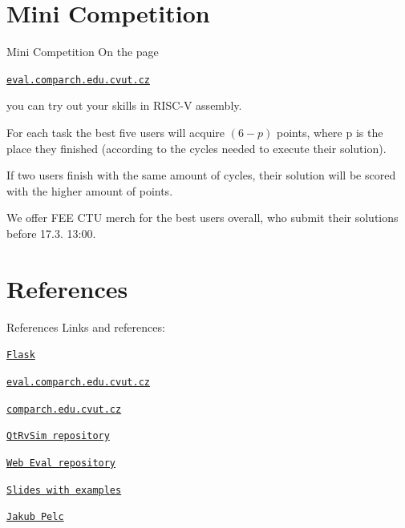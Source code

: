 \documentclass{beamer}
\begin{document}
		\begin{frame}[fragile]
			\tiny
			\inputminted{toml}{examples/5/complex.toml}
		\end{frame}

	\section{Mini Competition}

	\begin{frame}{Mini Competition}
		On the page \par
		{\centering \texttt{\href{http://eval.comparch.edu.cvut.cz}{eval.comparch.edu.cvut.cz}} \par}
		you can try out your skills in RISC-V assembly. \par

		For each task the best five users will acquire $(6 - p)$ points, where p is the place they finished (according to the cycles needed to execute their solution).\par
		
		If two users finish with the same amount of cycles, their solution will be scored with the higher amount of points. \par

		We offer FEE CTU merch for the best users overall, who submit their solutions before 17.3. 13:00. \par
	\end{frame}

	\section{References}

	\begin{frame}{References}
		Links and references: \par
		{\centering \texttt{\href{https://flask.palletsprojects.com/en/3.0.x/}{Flask}} \par}
		{\centering \texttt{\href{http://eval.comparch.edu.cvut.cz}{eval.comparch.edu.cvut.cz}} \par}
		{\centering \texttt{\href{http://comparch.edu.cvut.cz}{comparch.edu.cvut.cz}} \par}
		{\centering \texttt{\href{https://github.com/cvut/qtrvsim}{QtRvSim repository}} \par}
		{\centering \texttt{\href{https://gitlab.fel.cvut.cz/b35apo/qtrvsim-eval-web}{Web Eval repository}} \par}
		{\centering \texttt{\href{https://github.com/kubakubakuba/if24-flask-web-eval}{Slides with examples}} \par}
		{\centering \texttt{\href{https://swpelc.eu}{Jakub Pelc}} \par}
	\end{frame}
\end{document}
